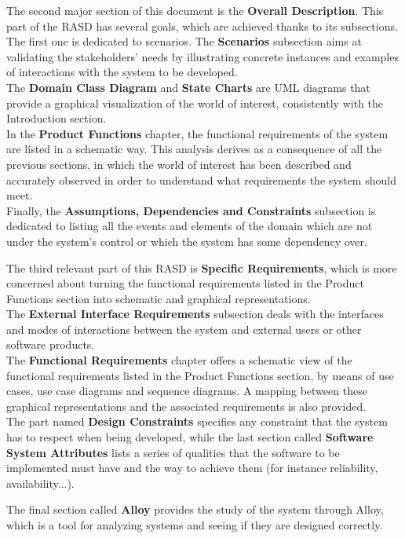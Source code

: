 The second major section of this document is the \textbf{Overall Description}. This part of the RASD has several goals, which are achieved thanks to its subsections.\\
The first one is dedicated to scenarios. The \textbf{Scenarios} subsection aims at validating the stakeholders' needs by illustrating concrete instances and examples of interactions with the system to be developed.\\
The \textbf{Domain Class Diagram} and \textbf{State Charts} are UML diagrams that provide a graphical visualization of the world of interest, consistently with the Introduction section.\\
In the \textbf{Product Functions} chapter, the functional requirements of the system are listed in a schematic way. This analysis derives as a consequence of all the previous sections, in which the world of interest has been described and accurately observed in order to understand what requirements the system should meet.\\
Finally, the \textbf{Assumptions, Dependencies and Constraints} subsection is dedicated to listing all the events and elements of the domain which are not under the system's control or which the system has some dependency over.

The third relevant part of this RASD is \textbf{Specific Requirements}, which is more concerned about turning the functional requirements listed in the Product Functions section into schematic and graphical representations.\\
The \textbf{External Interface Requirements} subsection deals with the interfaces and modes of interactions between the system and external users or other software products.\\
The \textbf{Functional Requirements} chapter offers a schematic view of the functional requirements listed in the Product Functions section, by means of use cases, use case diagrams and sequence diagrams. A mapping between these graphical representations and the associated requirements is also provided.\\
The part named \textbf{Design Constraints} specifies any constraint that the system has to respect when being developed, while the last section called \textbf{Software System Attributes} lists a series of qualities that the software to be implemented must have and the way to achieve them (for instance reliability, availability...).

The final section called \textbf{Alloy} provides the study of the system through Alloy, which is a tool for analyzing systems and seeing if they are designed correctly.











